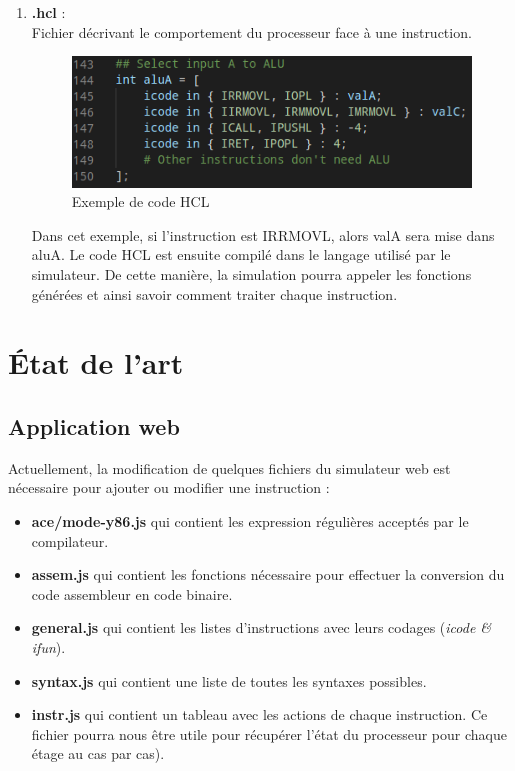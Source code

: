 \documentclass[french]{article}
\begin{document}
\begin{enumerate}
    \item \textbf{.hcl} :\\
    Fichier décrivant le comportement du processeur face à une instruction.\\
    \begin{figure}[H]
        \centering
        \includegraphics{img/ex_hcl.png}
        \caption{Exemple de code HCL}
        \label{fig:ex_hcl}
    \end{figure}
    Dans cet exemple, si l'instruction est IRRMOVL, alors valA sera mise dans aluA. Le code HCL est ensuite compilé dans le langage utilisé par le simulateur. De cette manière, la simulation pourra appeler les fonctions générées et ainsi savoir comment traiter chaque instruction.
\end{enumerate}

\section{État de l'art}

\subsection{Application web \cite{webapp-ub}}

Actuellement, la modification de quelques fichiers du simulateur web est nécessaire pour ajouter ou modifier une instruction :
\begin{itemize}
    \item \textbf{ace/mode-y86.js} qui contient les expression régulières acceptés par le compilateur.
    \item \textbf{assem.js} qui contient les fonctions nécessaire pour effectuer la conversion du code assembleur en code binaire.
    \item \textbf{general.js} qui contient les listes d'instructions avec leurs codages (\textit{icode \& ifun}).
    \item \textbf{syntax.js} qui contient une liste de toutes les syntaxes possibles.
    \item \textbf{instr.js} qui contient un tableau avec les actions de chaque instruction. Ce fichier pourra nous être utile pour récupérer l'état du processeur pour chaque étage au cas par cas). \\
\end{itemize}
\end{document}
